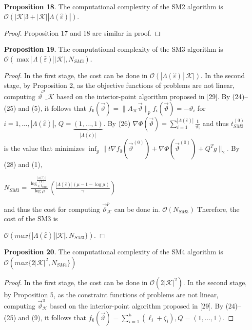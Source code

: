 \documentclass[]{iosart2c}
\begin{document}
    \textbf{Proposition 18}. The computational complexity of the
    SM2 algorithm is $\mathcal{O}(|\mathcal{K}|3 + |\mathcal{K}| |\Lambda(\hat{\varepsilon})|)$.

    \begin{proof}
        Proposition 17 and 18 are similar in proof.
    \end{proof}

    \textbf{Proposition 19}. The computational complexity of the
    SM3 algorithm is $\mathcal{O}(\max{|\Lambda(\hat{\varepsilon} )| |\mathcal{K}|,N_{SM3}})$.
    \begin{proof}
        In the first stage, the cost can be done in
        $\mathcal{O}(|\Lambda(\hat{\varepsilon})| |\mathcal{K}|)$. In the second stage, by Proposition
        2, as the objective functions of problems are not
        linear, computing $\vec{\vartheta}^p\_\mathcal{K}$
        based on the interior-point algorithm
        proposed in [29]. By (24)–(25) and (5), it
        follows that $f_0(\vec{\vartheta}) = \parallel A_\mathcal{K}\vec{\vartheta}\parallel_p f_i(\vec{\vartheta}) = -\vartheta_i$ for $i =
        1, ... , |\Lambda(\hat{\varepsilon})|$, $Q = \underbrace{(1, ... , 1)}_{|\Lambda(\hat{\varepsilon})|}$. By (26) $\nabla \Phi \left( \vec{\vartheta} \right) = \sum^{|\Lambda(\hat{\varepsilon})|}_{i=1} \frac{1}{\vartheta_i}$
        and thus $t^{(0)}_{SM3}$ is the value that minimizes
        $\inf_g \parallel t \nabla f_0 \left( \vec{\vartheta}^{(0)} \right) +\nabla \Phi \left( \vec{\vartheta}^{(0)} \right)+ Q^T g \parallel _2$. By (28)
        and (1),

        $N_{SM3} = \frac{ \log^{\frac{|\Lambda(\hat{\varepsilon})|}{(0)}}_{\in t_{SM3}}}{\log\mu} \left( \frac{ |\Lambda(\hat{\varepsilon})| (\mu - 1 - \log\mu)}{\gamma} \right)$

        and thus the cost for computing $\vec{\vartheta}^p_\mathcal{K}$ can be done
        in. $\mathcal{O}(N_{SM3})$ Therefore, the cost of the SM3 is

        $\mathcal{O}(max\{|\Lambda(\hat{\varepsilon})| |\mathcal{K}|,N_{SM3}\})$.
    \end{proof}

    \textbf{Proposition 20}. The computational complexity of the
    SM4 algorithm is $\mathcal{O}(max\{2|\mathcal{K}|^2,N_{SM4}\})$

    \begin{proof}
        In the first stage, the cost can be done in
        $\mathcal{O}(2 |\mathcal{K}|^2)$. In the second stage, by Proposition 5, as
        the constraint functions of problems are not linear,
        computing $\vec{\vartheta}^u_\mathcal{K}$
        based on the interior-point algorithm
        proposed in [29]. By (24)–(25) and (9), it follows that
        $f_0\left(\vec{\vartheta}\right) = \sum^h_{i=1}(\ell_i + \zeta_i),Q = (1, ... , 1)$.
    \end{proof}
\end{document}
